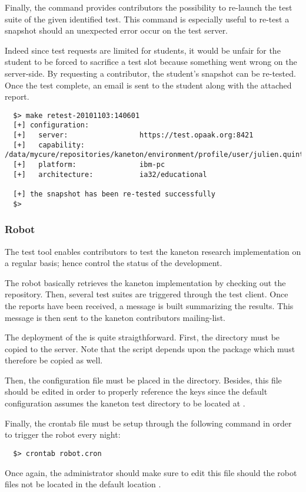 Finally, the  command provides contributors the possibility to
re-launch the test suite of the given identified test. This command is
especially useful to re-test a snapshot should an unexpected error occur on
the test server.

Indeed since test requests are limited for students, it would be unfair for the
student to be forced to sacrifice a test slot because something went wrong
on the server-side. By requesting a contributor, the student's snapshot can
be re-tested. Once the test complete, an email is sent to the student along
with the attached report.

\begin{verbatim}
  $> make retest-20101103:140601
  [+] configuration:
  [+]   server:                 https://test.opaak.org:8421
  [+]   capability:             /data/mycure/repositories/kaneton/environment/profile/user/julien.quintard/julien.quintard.cap
  [+]   platform:               ibm-pc
  [+]   architecture:           ia32/educational

  [+] the snapshot has been re-tested successfully
  $> 
\end{verbatim}

%
%
\subsubsection{Robot}

The  test tool enables contributors to test the kaneton research
implementation on a regular basis; hence control the status of the development.

The robot basically retrieves the kaneton implementation by checking out the
 repository. Then, several test suites are triggered through
the test client. Once the reports have been received, a message is built
summarizing the results. This message is then sent to the kaneton contributors
mailing-list.

The deployment of the  is quite straigthforward. First, the
 directory must be copied to the server. Note that
the  script depends upon the  package which must
therefore be copied as well.

Then, the  configuration file  must be placed in
the  directory. Besides, this file should be edited in
order to properly reference the  keys since the default configuration
assumes the kaneton test directory to be located at .

Finally, the  crontab file must be setup through the
following command in order to trigger the robot every night:

\begin{verbatim}
  $> crontab robot.cron
\end{verbatim}

Once again, the administrator should make sure to edit this file should
the robot files not be located in the default location \ie{}
.
